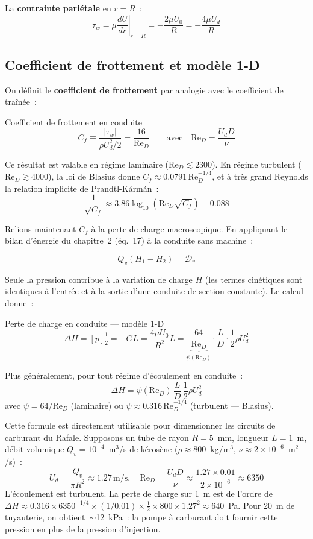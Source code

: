 \documentclass[11pt,a4paper]{report}
\begin{document}
La \textbf{contrainte pariétale} en $r=R$~:
\[
    \tau_w = \mu\left.\frac{dU}{dr}\right|_{r=R} = -\frac{2\mu U_0}{R}
    = -\frac{4\mu U_d}{R}
\]

\subsection{Coefficient de frottement et modèle 1-D}

On définit le \textbf{coefficient de frottement} par analogie avec le
coefficient de traînée~:

\begin{defbox}{Coefficient de frottement en conduite}
\[
    C_f \equiv \frac{|\tau_w|}{\rho U_d^2/2} = \frac{16}{\mathrm{Re}_D}
    \qquad \text{avec} \quad \mathrm{Re}_D = \frac{U_d D}{\nu}
\]
\end{defbox}

Ce résultat est valable en régime laminaire ($\mathrm{Re}_D \lesssim 2300$).
En régime turbulent ($\mathrm{Re}_D \gtrsim 4000$), la loi de Blasius donne
$C_f \approx 0.0791\,\mathrm{Re}_D^{-1/4}$, et à très grand Reynolds la
relation implicite de Prandtl-Kármán~:
\[
    \frac{1}{\sqrt{C_f}} \approx 3.86\log_{10}\!\left(\mathrm{Re}_D\sqrt{C_f}\right) - 0.088
\]

Relions maintenant $C_f$ à la perte de charge macroscopique.
En appliquant le bilan d'énergie du chapitre~2 (éq.~17) à la conduite
sans machine~:

\[
    Q_v(H_1 - H_2) = \mathcal{D}_v
\]

Seule la pression contribue à la variation de charge $H$ (les termes cinétiques
sont identiques à l'entrée et à la sortie d'une conduite de section constante).
Le calcul donne~:

\begin{importantbox}{Perte de charge en conduite --- modèle 1-D}
\[
    \Delta H = [p]^1_2 = -GL = \frac{4\mu U_0}{R^2} L
    = \underbrace{\frac{64}{\mathrm{Re}_D}}_{\psi(\mathrm{Re}_D)}
    \cdot\frac{L}{D}\cdot\frac{1}{2}\rho U_d^2
\]

Plus généralement, pour tout régime d'écoulement en conduite~:
\[
    \Delta H = \psi(\mathrm{Re}_D)\,\frac{L}{D}\,\frac{1}{2}\rho U_d^2
\]
avec $\psi = 64/\mathrm{Re}_D$ (laminaire) ou $\psi \approx 0.316\,\mathrm{Re}_D^{-1/4}$
(turbulent --- Blasius).
\end{importantbox}

Cette formule est directement utilisable pour dimensionner les circuits de
carburant du Rafale. Supposons un tube de rayon $R=5$~mm, longueur $L=1$~m,
débit volumique $Q_v=10^{-4}$~m$^3$/s de kérosène ($\rho\approx800$~kg/m$^3$,
$\nu\approx 2\times10^{-6}$~m$^2$/s)~:
\[
    U_d = \frac{Q_v}{\pi R^2} \approx 1.27\,\text{m/s},
    \quad
    \mathrm{Re}_D = \frac{U_d D}{\nu} \approx \frac{1.27\times0.01}{2\times10^{-6}} \approx 6350
\]
L'écoulement est turbulent. La perte de charge sur 1~m est de l'ordre de
$\Delta H \approx 0.316\times6350^{-1/4}\times(1/0.01)\times\frac{1}{2}\times800\times1.27^2
\approx 640$~Pa. Pour 20~m de tuyauterie, on obtient~$\sim$12~kPa~: la pompe
à carburant doit fournir cette pression en plus de la pression d'injection.
\end{document}
